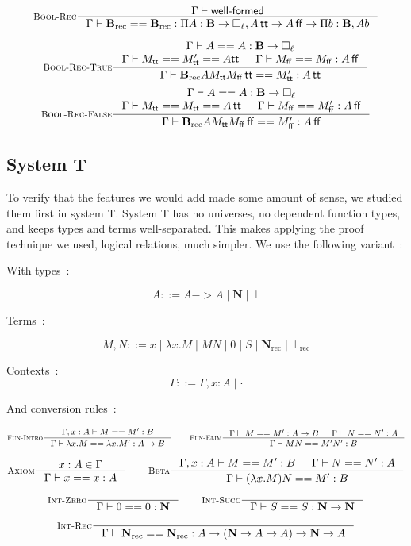 \documentclass[11pt]{article}
\DeclareMathOperator{\rec}{rec}
\DeclareMathOperator{\true}{\mathsf{tt}}
\DeclareMathOperator{\false}{\mathsf{ff}}
\newcommand{\0}{\mathbf{0}}
\newcommand{\1}{\mathbf{1}}
\newcommand{\nat}{\mathbf{N}}
\newcommand{\bool}{\mathbf{B}}
\newcommand{\tctx}{\Gamma}
\newcommand{\Wf}{\textsf{well-formed}}
\begin{document}
$$
    \inference[\textsc{Bool-Rec}]{\tctx |- \Wf}{\tctx |- \bool_{\rec} == \bool_{\rec} : \Pi A : \bool \to \square_\ell, A \true \to A\false \to \Pi b :\bool, A b}
$$


$$
    \inference[\textsc{Bool-Rec-True}]{\tctx |- A == A : \bool -> \square_\ell \\ \tctx |- M_{\true} == M'_{\true} == A {\true} & \tctx |- M_{\false} == M_{\false} : A \false}{\tctx |- \bool_{\rec} A M_{\true} M_{\false} \true == M'_{\true} : A \true}
$$
$$
    \inference[\textsc{Bool-Rec-False}]{\tctx |- A == A : \bool -> \square_\ell \\ \tctx |- M_{\true} == M_{\true} == A \true & \tctx |- M_{\false} == M'_{\false} : A \false}{\tctx |- \bool_{\rec} A M_{\true} M_{\false} \false == M'_{\false} : A \false}
$$

\subsection{System T}
To verify that the features we would add made some amount of sense, we studied them first in system T.
System T has no universes, no dependent function types, and keeps types and terms well-separated.
This makes applying the proof technique we used, logical relations, much simpler.
We use the following variant~:

With types~:

$$ A ::= A -> A \mid \nat \mid \bot $$

Terms~:

$$ M,N ::= x \mid \lambda x. M \mid MN \mid 0 \mid S \mid \nat_{\rec} \mid \bot_{\rec} $$


Contexts~:
$$ \tctx ::= \tctx, x : A \mid \cdot $$

And conversion rules~:


$$
    \inference[\textsc{Fun-Intro}]{\tctx, x : A |- M == M' : B }{\tctx |- \lambda x. M == \lambda x. M' : A -> B} \qquad
    \inference[\textsc{Fun-Elim}]{\tctx |- M == M' : A -> B& \tctx |- N == N' : A}{\tctx |- MN == M'N' : B}
$$

$$
    \inference[\textsc{Axiom}]{x : A \in \tctx }{\tctx |- x == x : A} \qquad
    \inference[\textsc{Beta}]{\tctx, x : A |- M == M' : B & \tctx |- N == N' : A}{\tctx |- (\lambda x. M)N == M' : B}
$$

$$
    \inference[\textsc{Int-Zero}]{}{\tctx |- 0 == 0 : \nat} \qquad
    \inference[\textsc{Int-Succ}]{}{\tctx |- S == S : \nat -> \nat}
$$

$$
    \inference[\textsc{Int-Rec}]{}{\tctx |- \nat_{\rec} == \nat_{\rec} : A \to \left(\nat -> A -> A \right) -> \nat -> A}
$$
\end{document}
